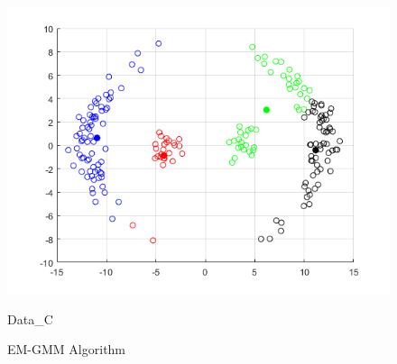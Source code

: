 \documentclass[12pt]{article}
\begin{document}
\begin{figure}[H]
	  \includegraphics[width=\linewidth]{figs/1-b-em-c.png}
	  \caption{Data\_C}\label{fig:kmeans-c}
	\endminipage
	\caption{EM-GMM Algorithm}
\end{figure}
\end{document}
